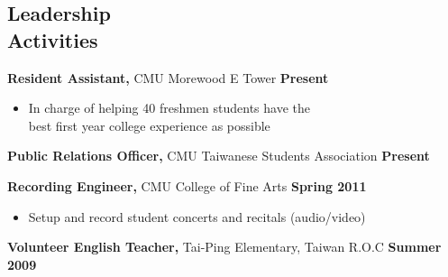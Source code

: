 \documentclass[sectioned]{dsyangres}
\begin{document}
\begin{resume}
\section{Leadership \\ Activities}

\textbf{Resident Assistant,} CMU Morewood E Tower \hfill \textbf{Present}
  \begin{itemize} \itemsep -2pt
    \item In charge of helping 40 freshmen students have the\\ best
      first year college experience as possible
  \end{itemize}

\textbf{Public Relations Officer,} CMU Taiwanese Students
  Association \hfill \textbf{ Present}

\textbf{Recording Engineer,} CMU College of Fine Arts \hfill
\textbf{ Spring 2011}
  \begin{itemize} \itemsep -2pt
    \item Setup and record student concerts and recitals (audio/video)
  \end{itemize}

\textbf{Volunteer English Teacher,} Tai-Ping Elementary, Taiwan R.O.C \hfill \textbf{ Summer 2009}

\end{resume}
\end{document}

